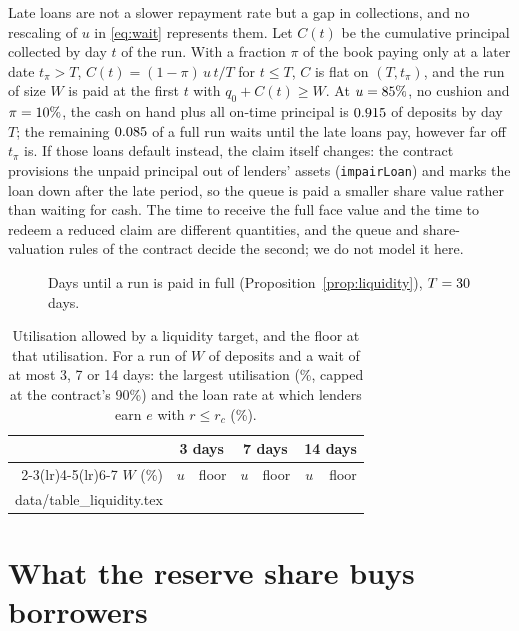 \documentclass[preprint,11pt,authoryear]{elsarticle}
\makeatletter
\theoremstyle{definition}
\newcommand{\inputrows}[1]{\@@input #1 }
\makeatother
\begin{document}
Late loans are not a slower repayment rate but a gap in collections, and no rescaling of $u$ in \eqref{eq:wait}
represents them. Let $C(t)$ be the cumulative principal collected by day $t$ of the run. With a fraction $\pi$ of the
book paying only at a later date $t_\pi>T$, $C(t)=(1-\pi)\,u\,t/T$ for $t\le T$, $C$ is flat on $(T,t_\pi)$, and the
run of size $W$ is paid at the first $t$ with $q_0+C(t)\ge W$. At $u=85\%$, no cushion and $\pi=10\%$, the cash on hand
plus all on-time principal is $0.915$ of deposits by day $T$; the remaining $0.085$ of a full
run waits until the late loans pay, however far off $t_\pi$ is. If those loans default instead, the claim itself
changes: the contract provisions the unpaid principal out of lenders' assets (\texttt{impairLoan}) and marks the loan
down after the late period, so the queue is paid a smaller share value rather than waiting for cash. The time to
receive the full face value and the time to redeem a reduced claim are different quantities, and the queue and
share-valuation rules of the contract decide the second; we do not model it here.

\begin{figure}[ht]
  \centering
  
  \caption{Days until a run is paid in full (Proposition~\ref{prop:liquidity}), $T=30$ days.}
  \label{fig:liquidity}
\end{figure}

\begin{table}[ht]
  \centering\small
  \caption{Utilisation allowed by a liquidity target, and the floor at that utilisation. For a run of $W$ of deposits
  and a wait of at most 3, 7 or 14 days: the largest utilisation (\%, capped at the contract's 90\%) and the loan
  rate at which lenders earn $e$ with $r\le r_c$ (\%).}
  \label{tab:liquidity}
  \begin{tabular}{rrrrrrr}
    \toprule
    & \multicolumn{2}{c}{3 days} & \multicolumn{2}{c}{7 days} & \multicolumn{2}{c}{14 days} \\
    \cmidrule(lr){2-3}\cmidrule(lr){4-5}\cmidrule(lr){6-7}
    $W$ (\%) & $u$ & floor & $u$ & floor & $u$ & floor \\
    \midrule
    \inputrows{data/table_liquidity.tex}
    \bottomrule
  \end{tabular}
\end{table}

\section{What the reserve share buys borrowers}\label{sec:growth}
\end{document}
